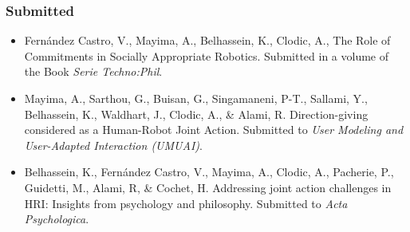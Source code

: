 \documentclass[a4paper,11pt,twoside]{StyleThese}
\begin{document}

\subsubsection*{Submitted}
\begin{itemize}
\item Fernández Castro, V., Mayima, A., Belhassein, K., Clodic, A., The Role of Commitments in Socially Appropriate Robotics. Submitted in a volume of the Book \textit{Serie Techno:Phil}.

\item Mayima, A., Sarthou, G., Buisan, G., Singamaneni, P-T., Sallami, Y., Belhassein, K., Waldhart, J., Clodic, A., \& Alami, R. Direction-giving considered as a Human-Robot Joint
Action. Submitted to \textit{User Modeling and User-Adapted Interaction (UMUAI)}.

\item Belhassein, K., Fernández Castro, V., Mayima, A., Clodic, A., Pacherie, P., Guidetti, M., Alami, R, \& Cochet, H. Addressing joint action challenges in HRI: Insights from psychology
and philosophy. Submitted to \textit{Acta Psychologica}.
\end{itemize}	







 

\ifdefined{}
\else


\end{document}
